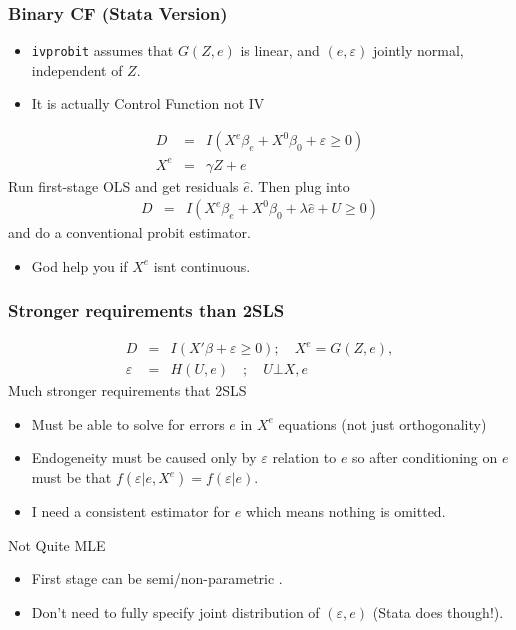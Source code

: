\documentclass[11pt,dvipsnames,table,aspectratio=169]{beamer}
\begin{document}
\begin{frame}
\frametitle{Binary CF (Stata Version)}
\begin{itemize}
\item \texttt{ivprobit} assumes that $G(Z,e)$ is linear, and $(e,\varepsilon)$ jointly normal, independent of $Z$.
\item It is actually Control Function not IV
\end{itemize}
\begin{eqnarray*}
D &=& I ( X^e  \beta_e + X^0 \beta_0+ \varepsilon \geq 0 ) \\
 X^e &=& \gamma Z + e  
\end{eqnarray*}
Run first-stage OLS and get residuals $\hat{e}$. Then plug into
\begin{eqnarray*}
D &=& I ( X^e  \beta_e + X^0 \beta_0 + \lambda \hat{e} + U  \geq 0 )
\end{eqnarray*}
and do a conventional probit estimator.
\begin{itemize}
\item God help you if $X^e$ isnt continuous.
\end{itemize}

\end{frame}

\begin{frame}
\frametitle{Stronger requirements than 2SLS}
\vspace{-10pt}
\begin{eqnarray*}
D &=& I ( X' \beta + \varepsilon \geq 0 ) ; \quad  X^e = G(Z,e) ,  \\
\varepsilon &=& H(U,e) \quad ; \quad U \bot X,e
\end{eqnarray*}
Much stronger requirements that 2SLS
\begin{itemize}
\item Must be able to solve for errors $e$ in $X^e$ equations (not just orthogonality)
\item Endogeneity must be caused only by $\varepsilon$ relation to $e$ so after conditioning on $e$ must be that $f(\varepsilon | e, X^{e}) = f( \varepsilon | e)$.
\item I need a consistent estimator for $e$ which means nothing is omitted.
\end{itemize}
Not Quite MLE
\begin{itemize}
\item First stage can be semi/non-parametric .
\item Don't need to fully specify joint distribution of $(\varepsilon,e)$ (Stata does though!).
\end{itemize}

\end{frame}
\end{document}
